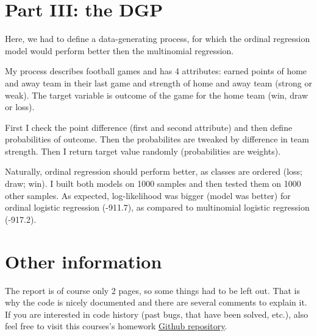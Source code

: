 \documentclass{article}
\begin{document}
\section{Part III: the DGP}

Here, we had to define a data-generating process, for which the ordinal regression model would perform better then the multinomial regression.

My process describes football games and has 4 attributes: earned points of home and away team in their last game and strength of home and away team (strong or weak). The target variable is outcome of the game for the home team (win, draw or loss).

First I check the point difference (first and second attribute) and then define probabilities of outcome. Then the probabilites are tweaked by difference in team strength. Then I return target value randomly (probabilities are weights).

Naturally, ordinal regression should perform better, as classes are ordered (loss; draw; win). I built both models on 1000 samples and then tested them on 1000 other samples. As expected, log-likelihood was bigger (model was better) for ordinal logistic regression (-911.7), as compared to multinomial logistic regression (-917.2).

\section{Other information}
The report is of course only 2 pages, so some things had to be left out. That is why the code is nicely documented and there are several comments to explain it. If you are interested in code history (past bugs, that have been solved, etc.), also feel free to visit this courses's homework \href{https://github.com/majbc1999/ml-for-data-science-homeworks} {Github repository}.



\printbibliography
\end{document}
